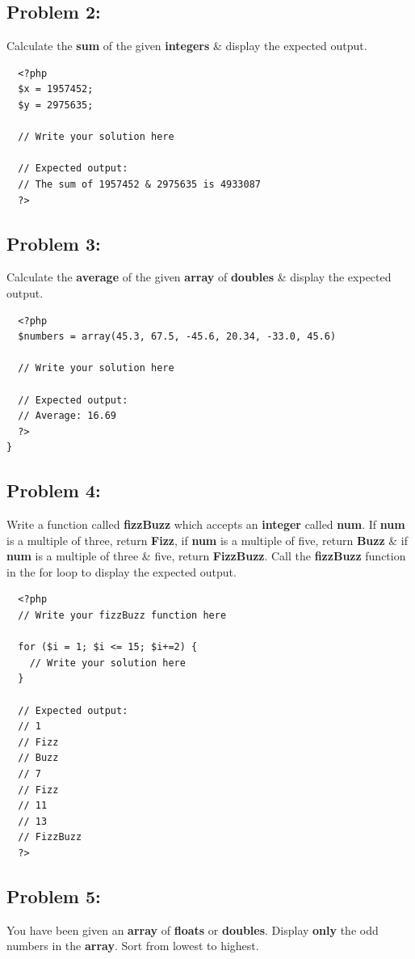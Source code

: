 \documentclass{article}
\begin{document}
\subsection*{Problem 2:} Calculate the \textbf{sum} of the given \textbf{integers} \& display the expected output.

\begin{verbatim}
  <?php
  $x = 1957452;
  $y = 2975635;

  // Write your solution here

  // Expected output:
  // The sum of 1957452 & 2975635 is 4933087
  ?>
\end{verbatim}

\subsection*{Problem 3:} 
Calculate the \textbf{average} of the given \textbf{array} of \textbf{doubles} \& display the expected output.

\begin{verbatim}
  <?php
  $numbers = array(45.3, 67.5, -45.6, 20.34, -33.0, 45.6)

  // Write your solution here

  // Expected output:
  // Average: 16.69 
  ?>
}
\end{verbatim}

\subsection*{Problem 4:}
Write a function called \textbf{fizzBuzz} which accepts an \textbf{integer} called \textbf{num}. If \textbf{num} is a multiple of three, return \textbf{Fizz}, if \textbf{num} is a multiple of five, return \textbf{Buzz} \& if \textbf{num} is a multiple of three \& five, return \textbf{FizzBuzz}. Call the \textbf{fizzBuzz} function in the for loop to display the expected output.

\begin{verbatim}
  <?php
  // Write your fizzBuzz function here
  
  for ($i = 1; $i <= 15; $i+=2) {
    // Write your solution here
  }

  // Expected output:
  // 1
  // Fizz
  // Buzz
  // 7
  // Fizz
  // 11
  // 13
  // FizzBuzz
  ?>
\end{verbatim}

\subsection*{Problem 5:}
You have been given an \textbf{array} of \textbf{floats} or \textbf{doubles}. Display \textbf{only} the odd numbers in the \textbf{array}. Sort from lowest to highest.
\end{document}
